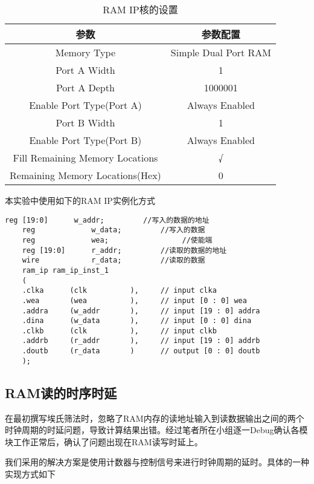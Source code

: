 	\begin{table}[htpb]
		\centering
		\caption{RAM IP核的设置}
		\renewcommand{\arraystretch}{1.5}
		\begin{tabular}{cc}
			\hline
			参数                              & 参数配置                 \\ \hline
			Memory Type                     & Simple Dual Port RAM \\ 
			Port A Width                    & 1                    \\ 
			Port A Depth                    & 1000001              \\ 
			Enable Port Type(Port A)        & Always Enabled       \\ 
			Port B Width                    & 1                    \\ 
			Enable Port Type(Port B)        & Always Enabled       \\ 
			Fill Remaining Memory Locations & √                    \\ 
			Remaining Memory Locations(Hex) & 0                    \\ \hline
		\end{tabular}
	\end{table}

	本实验中使用如下的RAM IP实例化方式
	\begin{lstlisting}[style=verilog]
	reg [19:0]      w_addr;	        //写入的数据的地址
	reg             w_data;	        //写入的数据
	reg             wea;			     //使能端
	reg [19:0]      r_addr;         //读取的数据的地址
	wire            r_data;	        //读取的数据
	ram_ip ram_ip_inst_1 
	(
	.clka      (clk          ),     // input clka
	.wea       (wea          ),     // input [0 : 0] wea
	.addra     (w_addr       ),     // input [19 : 0] addra
	.dina      (w_data       ),     // input [0 : 0] dina
	.clkb      (clk          ),     // input clkb
	.addrb     (r_addr       ),     // input [19 : 0] addrb
	.doutb     (r_data       )      // output [0 : 0] doutb
	);
	\end{lstlisting}
	\subsection{RAM读的时序时延}
	在最初撰写埃氏筛法时，忽略了RAM内存的读地址输入到读数据输出之间的两个时钟周期的时延问题，导致计算结果出错。经过笔者所在小组逐一Debug确认各模块工作正常后，确认了问题出现在RAM读写时延上。
	
	我们采用的解决方案是使用计数器与控制信号来进行时钟周期的延时。具体的一种实现方式如下
	
